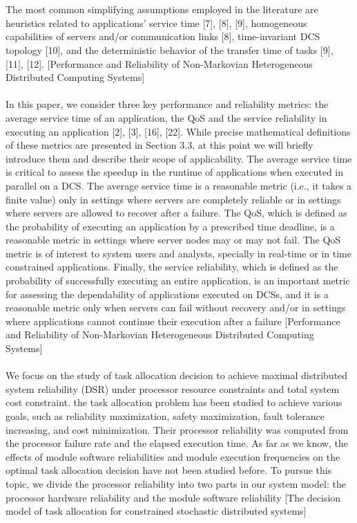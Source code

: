 \documentclass{cslthse-msc}
\begin{document}
\\\\
The most common simplifying assumptions employed in the literature are heuristics related to applications’ service time [7], [8], [9], homogeneous capabilities of servers and/or communication links [8], time-invariant DCS topology [10], and the deterministic behavior of the transfer time of tasks [9], [11], [12]. [Performance and Reliability of Non-Markovian Heterogeneous Distributed Computing Systems]
\\\\
In this paper, we consider three key performance and reliability metrics: the average service time of an application, the QoS and the service reliability in executing an application [2], [3], [16], [22]. While precise mathematical definitions of these metrics are presented in Section 3.3, at this point we will briefly introduce them and describe their scope of applicability. The average service time is critical to assess the speedup in the runtime of applications when executed in parallel on a DCS. The average service time is a reasonable metric (i.e., it takes a finite value) only in settings where servers are completely reliable or in settings where servers are allowed to recover after a failure. The QoS, which is defined as the probability of executing an application by a prescribed time deadline, is a reasonable metric in settings where server nodes may or may not fail. The QoS metric is of interest to system users and analysts, specially in real-time or in time constrained applications. Finally, the service reliability, which is defined as the probability of successfully executing an entire application, is an important metric for assessing the dependability of applications executed on DCSs, and it is a reasonable metric only when servers can fail without recovery and/or in settings where applications cannot continue their execution after a failure [Performance and Reliability of Non-Markovian Heterogeneous Distributed Computing Systems]
\\\\
We focus on the study of task allocation decision to achieve maximal distributed system reliability (DSR) under processor resource constraints and total system cost constraint. the task allocation problem has been studied to achieve various goals, such as reliability maximization, safety maximization, fault tolerance increasing, and cost minimization. Their processor reliability was computed from the processor failure rate and the elapsed execution time. As far as we know, the effects of module software reliabilities and module execution frequencies on the optimal task allocation decision have not been studied before. To pursue this topic, we divide the processor reliability into two parts in our system model: the processor hardware reliability and the module software reliability [The decision model of task allocation for constrained stochastic distributed systems]
\end{document}
